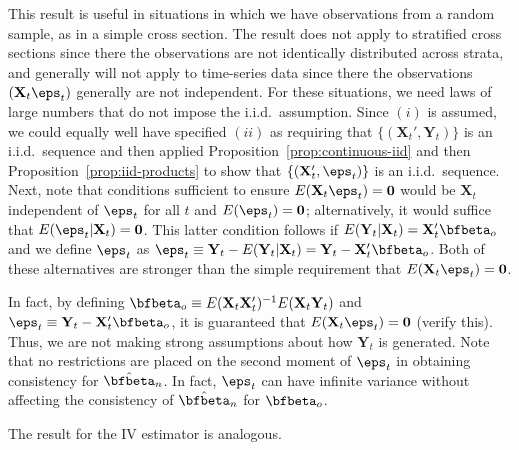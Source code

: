 This result is useful in situations in which we have observations from a random sample, as in a simple cross section. The result does not apply to stratified cross sections since there the observations are not identically distributed across strata, and generally will not apply to time-series data since there the observations $(\mathbf{X}_t \eps_t)$ generally are not independent. For these situations, we need laws of large numbers that do not impose the i.i.d.\ assumption. Since $(i)$ is assumed, we could equally well have specified $(ii)$ as requiring that $\{(\mathbf{X}_t', \mathbf{Y}_t)\}$ is an i.i.d.\ sequence and then applied Proposition~\ref{prop:continuous-iid} and then Proposition~\ref{prop:iid-products} to show that $\{(\mathbf{X}_t', \eps_t)\}$ is an i.i.d.\ sequence. Next, note that conditions sufficient to ensure $E(\mathbf{X}_t \eps_t) = \mathbf{0}$ would be $\mathbf{X}_t$ independent of $\eps_t$ for all $t$ and $E(\eps_t) = \mathbf{0}$; alternatively, it would suffice that $E(\eps_t | \mathbf{X}_t) = \mathbf{0}$. This latter condition follows if $E(\mathbf{Y}_t | \mathbf{X}_t) = \mathbf{X}_t' \bfbeta_o$ and we define $\eps_t$ as $\eps_t \equiv \mathbf{Y}_t - E(\mathbf{Y}_t | \mathbf{X}_t) = \mathbf{Y}_t - \mathbf{X}_t' \bfbeta_o$. Both of these alternatives are stronger than the simple requirement that $E(\mathbf{X}_t \eps_t) = \mathbf{0}$.

In fact, by defining $\bfbeta_o \equiv E(\mathbf{X}_t \mathbf{X}_t')^{-1} E(\mathbf{X}_t \mathbf{Y}_t)$ and $\eps_t \equiv \mathbf{Y}_t - \mathbf{X}_t' \bfbeta_o$, it is guaranteed that $E(\mathbf{X}_t \eps_t) = \mathbf{0}$ (verify this). Thus, we are not making strong assumptions about how $\mathbf{Y}_t$ is generated. Note that no restrictions are placed on the second moment of $\eps_t$ in obtaining consistency for $\hat{\bfbeta}_n$. In fact, $\eps_t$ can have infinite variance without affecting the consistency of $\hat{\bfbeta}_n$ for $\bfbeta_o$.

The result for the IV estimator is analogous.

